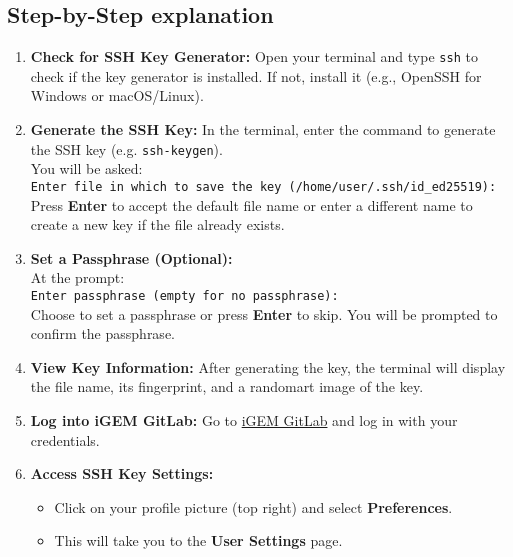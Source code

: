\subsection{Step-by-Step explanation} \label{subsec:ssh-explanation}
\begin{enumerate}
    \item \textbf{Check for SSH Key Generator:}  
    Open your terminal and type \texttt{ssh} to check if the key generator is installed.
    If not, install it (e.g., OpenSSH for Windows or macOS/Linux).
    \item \textbf{Generate the SSH Key:}
    In the terminal, enter the command to generate the SSH key (e.g. \texttt{ssh-keygen}). \\
    You will be asked:  \\ \newline
    \texttt{Enter file in which to save the key (/home/user/.ssh/id\_ed25519):} \\ \newline
    Press \textbf{Enter} to accept the default file name or enter a different name to create a new key if the file already exists.

    \item \textbf{Set a Passphrase (Optional):}   \\
    At the prompt:  \\ \newline
    \texttt{Enter passphrase (empty for no passphrase):} \\ \newline
    Choose to set a passphrase or press \textbf{Enter} to skip.
    You will be prompted to confirm the passphrase.

    \item \textbf{View Key Information:}
    After generating the key, the terminal will display the file name, its fingerprint, and a randomart image of the key.

    \item \textbf{Log into iGEM GitLab:}  
    Go to \href{https://gitlab.igem.org/}{iGEM GitLab} and log in with your credentials.

    \item \textbf{Access SSH Key Settings:}  
    \begin{itemize}
        \item Click on your profile picture (top right) and select \textbf{Preferences}.
        \item This will take you to the \textbf{User Settings} page.
    \end{itemize}


\end{enumerate}
